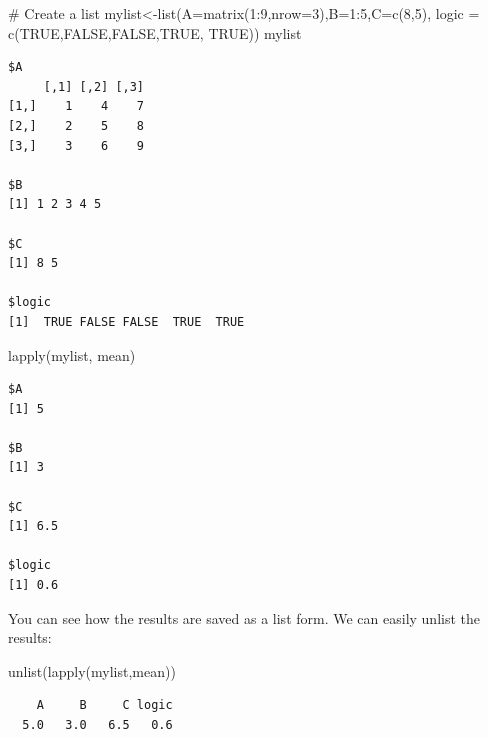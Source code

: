 \documentclass[
  letterpaper,
  DIV=11,
  numbers=noendperiod]{scrreprt}
\newenvironment{Shaded}{\begin{snugshade}}{\end{snugshade}}
\newcommand{\AttributeTok}[1]{\textcolor[rgb]{0.40,0.45,0.13}{#1}}
\newcommand{\CommentTok}[1]{\textcolor[rgb]{0.37,0.37,0.37}{#1}}
\newcommand{\ConstantTok}[1]{\textcolor[rgb]{0.56,0.35,0.01}{#1}}
\newcommand{\DecValTok}[1]{\textcolor[rgb]{0.68,0.00,0.00}{#1}}
\newcommand{\FunctionTok}[1]{\textcolor[rgb]{0.28,0.35,0.67}{#1}}
\newcommand{\NormalTok}[1]{\textcolor[rgb]{0.00,0.23,0.31}{#1}}
\newcommand{\OtherTok}[1]{\textcolor[rgb]{0.00,0.23,0.31}{#1}}
\newcommand{\SpecialCharTok}[1]{\textcolor[rgb]{0.37,0.37,0.37}{#1}}
\begin{document}
\begin{Shaded}
\begin{Highlighting}[]
\CommentTok{\# Create a list}
\NormalTok{mylist}\OtherTok{\textless{}{-}}\FunctionTok{list}\NormalTok{(}\AttributeTok{A=}\FunctionTok{matrix}\NormalTok{(}\DecValTok{1}\SpecialCharTok{:}\DecValTok{9}\NormalTok{,}\AttributeTok{nrow=}\DecValTok{3}\NormalTok{),}\AttributeTok{B=}\DecValTok{1}\SpecialCharTok{:}\DecValTok{5}\NormalTok{,}\AttributeTok{C=}\FunctionTok{c}\NormalTok{(}\DecValTok{8}\NormalTok{,}\DecValTok{5}\NormalTok{),  }\AttributeTok{logic =} \FunctionTok{c}\NormalTok{(}\ConstantTok{TRUE}\NormalTok{,}\ConstantTok{FALSE}\NormalTok{,}\ConstantTok{FALSE}\NormalTok{,}\ConstantTok{TRUE}\NormalTok{, }\ConstantTok{TRUE}\NormalTok{))}
\NormalTok{mylist}
\end{Highlighting}
\end{Shaded}

\begin{verbatim}
$A
     [,1] [,2] [,3]
[1,]    1    4    7
[2,]    2    5    8
[3,]    3    6    9

$B
[1] 1 2 3 4 5

$C
[1] 8 5

$logic
[1]  TRUE FALSE FALSE  TRUE  TRUE
\end{verbatim}

\begin{Shaded}
\begin{Highlighting}[]
\FunctionTok{lapply}\NormalTok{(mylist, mean)}
\end{Highlighting}
\end{Shaded}

\begin{verbatim}
$A
[1] 5

$B
[1] 3

$C
[1] 6.5

$logic
[1] 0.6
\end{verbatim}

You can see how the results are saved as a list form. We can easily
unlist the results:

\begin{Shaded}
\begin{Highlighting}[]
\FunctionTok{unlist}\NormalTok{(}\FunctionTok{lapply}\NormalTok{(mylist,mean))}
\end{Highlighting}
\end{Shaded}

\begin{verbatim}
    A     B     C logic 
  5.0   3.0   6.5   0.6 
\end{verbatim}
\end{document}
